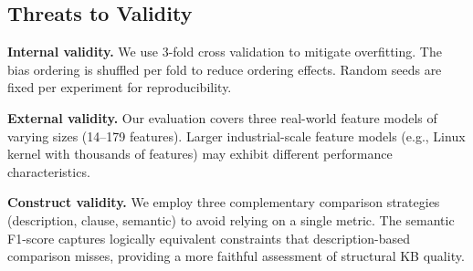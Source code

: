 \subsection{Threats to Validity}

\textbf{Internal validity.} We use 3-fold cross validation to mitigate overfitting. The bias ordering is shuffled per fold to reduce ordering effects. Random seeds are fixed per experiment for reproducibility.

\textbf{External validity.} Our evaluation covers three real-world feature models of varying sizes (14--179 features). Larger industrial-scale feature models (e.g., Linux kernel with thousands of features) may exhibit different performance characteristics.

\textbf{Construct validity.} We employ three complementary comparison strategies (description, clause, semantic) to avoid relying on a single metric. The semantic F1-score captures logically equivalent constraints that description-based comparison misses, providing a more faithful assessment of structural KB quality.

